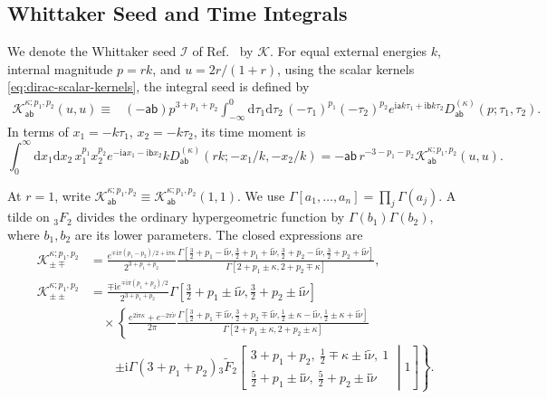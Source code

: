 \documentclass[a4paper,12pt]{article}
\newcommand{\ii}{\mathrm i}
\newcommand{\tn}{\tilde\nu}
\def\aa{\mathsf a}
\newcommand{\bb}{\mathsf b}
\newcommand{\di}{\mathrm d}
\begin{document}
\subsection{Whittaker Seed and Time Integrals}
\label{app:dirac-seed}
We denote the Whittaker seed $\mathcal I$ of
Ref.~\cite{qin-seed} by $\mathcal K$.
For equal external energies $k$, internal magnitude $p=rk$, and
$u=2r/(1+r)$, using the scalar kernels
\eqref{eq:dirac-scalar-kernels}, the integral seed is defined by
\begin{align}
 \mathcal K_{\aa\bb}^{\kappa;p_1,p_2}(u,u)
 \equiv{}&(-\aa\bb)p^{3+p_1+p_2}
 \int_{-\infty}^0\di\tau_1\di\tau_2\,
 (-\tau_1)^{p_1}(-\tau_2)^{p_2}
 e^{\ii\aa k\tau_1+\ii\bb k\tau_2}
 D^{(\kappa)}_{\aa\bb}(p;\tau_1,\tau_2).
 \label{eq:dirac-K-definition}
\end{align}
In terms of $x_1=-k\tau_1$, $x_2=-k\tau_2$, its time moment is
\begin{equation}
 \int_0^\infty\di x_1\di x_2\,x_1^{p_1}x_2^{p_2}e^{-\ii\aa x_1-\ii\bb x_2}
 kD^{(\kappa)}_{\aa\bb}(rk;-x_1/k,-x_2/k)
 =-\aa\bb\,r^{-3-p_1-p_2}\mathcal K_{\aa\bb}^{\kappa;p_1,p_2}(u,u).
 \label{eq:dirac-K-scaling}
\end{equation}

At $r=1$, write
$\mathcal K_{\aa\bb}^{\kappa;p_1,p_2}
\equiv\mathcal K_{\aa\bb}^{\kappa;p_1,p_2}(1,1)$.
We use $\Gamma[a_1,\ldots,a_n]=\prod_j\Gamma(a_j)$.
A tilde on ${}_3F_2$ divides the ordinary hypergeometric function by
$\Gamma(b_1)\Gamma(b_2)$, where $b_1,b_2$ are its lower parameters.
The closed expressions are
\begin{align}
 \mathcal K_{\pm\mp}^{\kappa;p_1,p_2}
 &=\frac{e^{\mp\ii\pi(p_1-p_2)/2+\ii\pi\kappa}}{2^{3+p_1+p_2}}
 \frac{\Gamma[\tfrac32+p_1-\ii\tn,\tfrac32+p_1+\ii\tn,
               \tfrac32+p_2-\ii\tn,\tfrac32+p_2+\ii\tn]}
 {\Gamma[2+p_1\pm\kappa,2+p_2\mp\kappa]},
 \label{eq:dirac-K-opposite}\\
 \mathcal K_{\pm\pm}^{\kappa;p_1,p_2}
 &=\frac{\mp\ii e^{\mp\ii\pi(p_1+p_2)/2}}{2^{3+p_1+p_2}}
 \Gamma[\tfrac32+p_1\pm\ii\tn,\tfrac32+p_2\pm\ii\tn]
 \nonumber\\
 &\quad\times\left\{
 \frac{e^{2\ii\pi\kappa}+e^{-2\pi\tn}}{2\pi}
 \frac{\Gamma[\tfrac32+p_1\mp\ii\tn,\tfrac32+p_2\mp\ii\tn,
               \tfrac12\pm\kappa-\ii\tn,\tfrac12\pm\kappa+\ii\tn]}
 {\Gamma[2+p_1\pm\kappa,2+p_2\pm\kappa]}
 \right.\nonumber\\
 &\qquad\left.
 \pm\ii\Gamma(3+p_1+p_2)
 {}_3\widetilde F_2\!\left[
 \begin{matrix}3+p_1+p_2,\ \tfrac12\mp\kappa\pm\ii\tn,\ 1\\
 \tfrac52+p_1\pm\ii\tn,\ \tfrac52+p_2\pm\ii\tn
 \end{matrix}\middle|1\right]\right\}.
 \label{eq:dirac-K-same}
\end{align}
\end{document}
